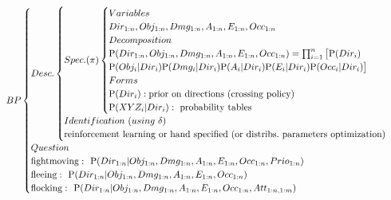 \begin{eqnarray*}
BP
\begin{cases}
Desc.
    \begin{cases}
    Spec. (\pi)
        \begin{cases}
        Variables\\
Dir_{1:n}, Obj_{1:n}, Dmg_{1:n}, A_{1:n}, E_{1:n}, Occ_{1:n} \\
        Decomposition\\
 \PP(Dir_{1:n}, Obj_{1:n}, Dmg_{1:n}, A_{1:n}, E_{1:n}, Occ_{1:n}) =  \prod_{i=1}^{n} \big[ \PP(Dir_i) \\
 \PP(Obj_i | Dir_i) \PP(Dmg_i | Dir_i) \PP(A_i | Dir_i) \PP(E_i | Dir_i) \PP(Occ_i | Dir_i)\big]\\
        Forms\\
\PP(Dir_i): \mathrm{prior\ on\ directions\ (crossing\ policy)} \\
\PP(XYZ_i | Dir_i):\ \mathrm{probability\ tables}\\
        \end{cases}\\
    Identification\ (using\ \delta)\\
\mathrm{reinforcement\ learning\ or\ hand\ specified\ (or\ distribs.\ parameters\ optimization)}
    \end{cases}\\
Question\\
 \mathrm{fight moving:}\ \ \PP(Dir_{1:n} \mathbf{|} Obj_{1:n}, Dmg_{1:n}, A_{1:n}, E_{1:n}, Occ_{1:n}, Prio_{1:n})\\
 \mathrm{fleeing:}\ \  \PP(Dir_{1:n} \mathbf{|} Obj_{1:n}, Dmg_{1:n}, A_{1:n}, E_{1:n}, Occ_{1:n})\\
 \mathrm{flocking:}\ \  \PP(Dir_{1:n} \mathbf{|} Obj_{1:n}, Dmg_{1:n}, A_{1:n}, E_{1:n}, Occ_{1:n}, Att_{1:n,1:m})\\
\end{cases}
\label{bp:BayesianUnit}
\end{eqnarray*}



